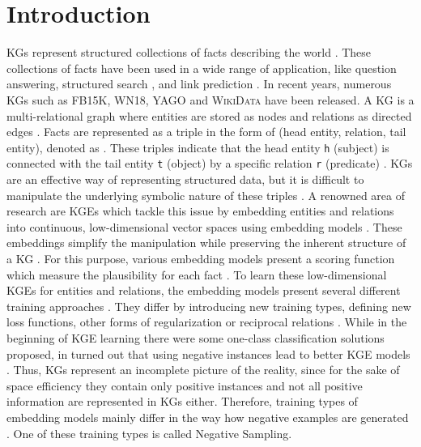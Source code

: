\chapter{Introduction}
\label{ch:introduction}

\acp{KG} represent structured collections of facts describing the world  \cite{hogan2020knowledge}.
These collections of facts have been used in a wide range of application, like question answering, structured search \cite{zhang2019nscaching}, and link prediction \cite{cai2017kbgan, Alam2020AffinityDN}.
In recent years, numerous \acp{KG} such as \textsc{FB15K}, \textsc{WN18}, \textsc{YAGO} \cite{ConEx} and \textsc{WikiData} \cite{arnaoutwikinegata} have been released.
A \ac{KG} is a multi-relational graph where entities are stored as nodes and relations as directed edges \cite{zhang2019nscaching}.
Facts are represented as a triple in the form of (head entity, relation, tail entity), denoted as \hrt.
These triples indicate that the head entity \texttt{h} (subject) is connected with the tail entity \texttt{t} (object) by a specific relation \texttt{r} (predicate) \cite{zhang2019nscaching, Alam2020AffinityDN}.
\acp{KG} are an effective way of representing structured data, but it is difficult to manipulate the underlying symbolic nature of these triples \cite{8047276}.
A renowned area of research are \acp{KGE} which tackle this issue by embedding entities and relations into continuous, low-dimensional vector spaces using embedding models \cite{Alam2020AffinityDN}.
These embeddings simplify the manipulation while preserving the inherent structure of a \ac{KG} \cite{8047276}. 
For this purpose, various embedding models present a scoring function which measure the plausibility for each fact \cite{8047276, ConvE, qiannegative}.
To learn these low-dimensional \acp{KGE} for entities and relations, the embedding models present several different training approaches \cite{Ruffinelli2020You}.
They differ by introducing new training types, defining new loss functions, other forms of regularization or reciprocal relations \cite{Ruffinelli2020You}.
While in the beginning of \ac{KGE} learning there were some one-class classification solutions proposed, in turned out that using negative instances lead to better \ac{KGE} models \cite{kotnis2017analysis}.
Thus, \acp{KG} represent an incomplete picture of the reality, since for the sake of space efficiency they contain only positive instances \cite{qiannegative} and not all positive information are represented in \acp{KG} either.
Therefore, training types of embedding models mainly differ in the way 
how negative examples are generated \cite{Ruffinelli2020You}. 
One of these training types is called Negative Sampling.











